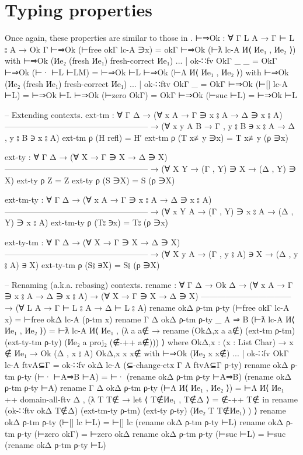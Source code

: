 \documentclass[logo,bsc,singlespacing,parskip,online]{infthesis}
\renewenvironment{code}{\mintedcopy[breaklines,breaksymbolleft=\;]{agda}}{\endmintedcopy}
\begin{document}
\section{Typing properties}
Once again, these properties are similar to those in \citet{wadler_programming_2022}.
\begin{code}
  ⊢⇒Ok : ∀ {Γ L A} → Γ ⊢ L ⦂ A → Ok Γ
  ⊢⇒Ok (⊢free okΓ lc-A ∋x) = okΓ
  ⊢⇒Ok (⊢ƛ lc-A И⟨ Иe₁ , Иe₂ ⟩) with ⊢⇒Ok (Иe₂ (fresh Иe₁) {fresh-correct Иe₁})
  ... | ok-∷fv OkΓ _ _ = OkΓ
  ⊢⇒Ok (⊢· ⊢L ⊢LM) = ⊢⇒Ok ⊢L
  ⊢⇒Ok (⊢Λ И⟨ Иe₁ , Иe₂ ⟩) with ⊢⇒Ok (Иe₂ (fresh Иe₁) {fresh-correct Иe₁})
  ... | ok-∷ftv OkΓ _ = OkΓ
  ⊢⇒Ok (⊢[] lc-A ⊢L) = ⊢⇒Ok ⊢L
  ⊢⇒Ok (⊢zero OkΓ) = OkΓ
  ⊢⇒Ok (⊢suc ⊢L) = ⊢⇒Ok ⊢L

  -- Extending contexts.
  ext-tm : ∀ {Γ Δ}
    → (∀ {x A}     →        Γ ∋ x ⦂ A → Δ ∋ x ⦂ A)
      -----------------------------------------------------
    → (∀ {x y A B} → Γ , y ⦂ B ∋ x ⦂ A → Δ , y ⦂ B ∋ x ⦂ A)
  ext-tm ρ (H refl) = H′
  ext-tm ρ (T x≢y ∋x) = T x≢y (ρ ∋x)

  ext-ty : ∀ {Γ Δ}
    → (∀ {X}     →        Γ ∋ X → Δ ∋ X)
      -----------------------------------------------------
    → (∀ {X Y} → (Γ , Y) ∋ X → (Δ , Y) ∋ X)
  ext-ty ρ Z = Z
  ext-ty ρ (S ∋X) = S (ρ ∋X)

  ext-tm-ty : ∀ {Γ Δ}
    → (∀ {x A}     →        Γ ∋ x ⦂ A → Δ ∋ x ⦂ A)
      -----------------------------------------------------
    → (∀ {x Y A} → (Γ , Y) ∋ x ⦂ A → (Δ , Y) ∋ x ⦂ A)
  ext-tm-ty ρ (T⦂ ∋x) = T⦂ (ρ ∋x)

  ext-ty-tm : ∀ {Γ Δ}
    → (∀ {X}     →        Γ ∋ X → Δ ∋ X)
      -----------------------------------------------------
    → (∀ {X y A} → (Γ , y ⦂ A) ∋ X → (Δ , y ⦂ A) ∋ X)
  ext-ty-tm ρ (S⦂ ∋X) = S⦂ (ρ ∋X)

  -- Renaming (a.k.a. rebasing) contexts.
  rename : ∀ {Γ Δ}
    → Ok Δ
    → (∀ {x A} → Γ ∋ x ⦂ A → Δ ∋ x ⦂ A)
    → (∀ {X} → Γ ∋ X → Δ ∋ X)
      ---------------------------------
    → (∀ {L A} → Γ ⊢ L ⦂ A → Δ ⊢ L ⦂ A)
  rename okΔ ρ-tm ρ-ty (⊢free okΓ lc-A x) = ⊢free okΔ lc-A (ρ-tm x)
  rename {Γ} {Δ} okΔ ρ-tm ρ-ty {_} {A ⇒ B} (⊢ƛ lc-A И⟨ Иe₁ , Иe₂ ⟩) =
    ⊢ƛ lc-A И⟨ Иe₁ , (λ a {a∉} →
      rename (OkΔ,x a a∉) (ext-tm ρ-tm) (ext-ty-tm ρ-ty) (Иe₂ a {proj₂ (∉-++ a∉)})) ⟩
    where
      OkΔ,x : (x : List Char) → x ∉ Иe₁ → Ok (Δ , x ⦂ A)
      OkΔ,x x x∉ with ⊢⇒Ok (Иe₂ x {x∉})
      ... | ok-∷fv OkΓ lc-A ftvA⊆Γ = ok-∷fv okΔ lc-A (⊆-change-ctx {Γ} {A} ftvA⊆Γ ρ-ty)
  rename okΔ ρ-tm ρ-ty (⊢· ⊢A⇒B ⊢A) = ⊢· (rename okΔ ρ-tm ρ-ty ⊢A⇒B) (rename okΔ ρ-tm ρ-ty ⊢A)
  rename {Γ} {Δ} okΔ ρ-tm ρ-ty (⊢Λ И⟨ Иe₁ , Иe₂ ⟩) =
    ⊢Λ И⟨ Иe₁ ++ domain-all-ftv Δ , (λ T {T∉} →
      let ⟨ T∉Иe₁ , T∉Δ ⟩ = ∉-++ T∉
      in rename (ok-∷ftv okΔ T∉Δ) (ext-tm-ty ρ-tm) (ext-ty ρ-ty) (Иe₂ T {T∉Иe₁}) ) ⟩
  rename okΔ ρ-tm ρ-ty (⊢[] lc ⊢L) = ⊢[] lc (rename okΔ ρ-tm ρ-ty ⊢L)
  rename okΔ ρ-tm ρ-ty (⊢zero okΓ) = ⊢zero okΔ
  rename okΔ ρ-tm ρ-ty (⊢suc ⊢L) = ⊢suc (rename okΔ ρ-tm ρ-ty ⊢L)


\end{code}
\end{document}
